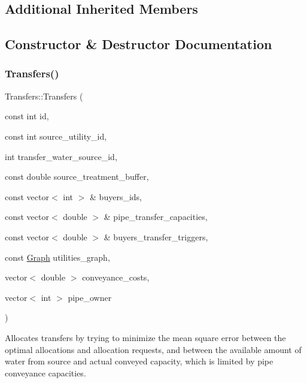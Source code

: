 \subsection*{Additional Inherited Members}


\subsection{Constructor \& Destructor Documentation}
\mbox{\label{classTransfers_a40555bc28e085d0e119a9f039317c79f}} 
\subsubsection{\texorpdfstring{Transfers()}{Transfers()}\hspace{0.1cm}{\footnotesize\ttfamily [1/2]}}
{\footnotesize\ttfamily Transfers\+::\+Transfers (\begin{DoxyParamCaption}\item[{const int}]{id,  }\item[{const int}]{source\+\_\+utility\+\_\+id,  }\item[{int}]{transfer\+\_\+water\+\_\+source\+\_\+id,  }\item[{const double}]{source\+\_\+treatment\+\_\+buffer,  }\item[{const vector$<$ int $>$ \&}]{buyers\+\_\+ids,  }\item[{const vector$<$ double $>$ \&}]{pipe\+\_\+transfer\+\_\+capacities,  }\item[{const vector$<$ double $>$ \&}]{buyers\+\_\+transfer\+\_\+triggers,  }\item[{const \mbox{\hyperlink{classGraph}{Graph}}}]{utilities\+\_\+graph,  }\item[{vector$<$ double $>$}]{conveyance\+\_\+costs,  }\item[{vector$<$ int $>$}]{pipe\+\_\+owner }\end{DoxyParamCaption})}

Allocates transfers by trying to minimize the mean square error between the optimal allocations and allocation requests, and between the available amount of water from source and actual conveyed capacity, which is limited by pipe conveyance capacities.


